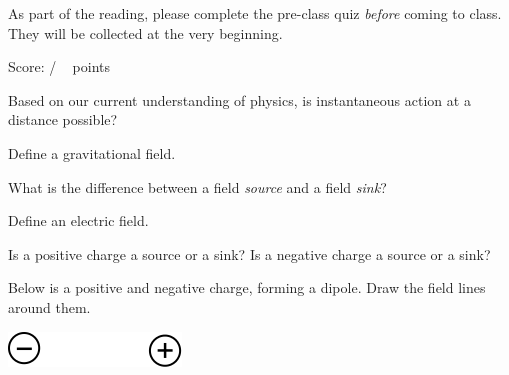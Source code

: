 \documentclass[addpoints,12pt]{exam}
\begin{document}
As part of the reading, please complete the pre-class quiz \textit{before} coming to class. They will be collected at the very beginning.
 
\clearpage

\begin{flushright}
Score: \hspace{0.2in} / \numpoints ~ points
\end{flushright}

\begin{questions}

\question[1]
Based on our current understanding of physics, is instantaneous action at a distance possible?
\fillwithlines{0.5in}

\question[1]
Define a gravitational field.
\fillwithlines{0.5in}

\question[2]
What is the difference between a field \textit{source} and a field \textit{sink}?
\fillwithlines{0.5in}

\question[1]
Define an electric field.
\fillwithlines{0.5in}

\question[2]
Is a positive charge a source or a sink? Is a negative charge a source or a sink?
\fillwithlines{0.5in}

\question[3]
Below is a positive and negative charge, forming a dipole. Draw the field lines around them.
\vspace{1.5in}
\begin{center}
\includegraphics[]{../images/dipole.png}
\end{center}



\end{questions}
\end{document}
